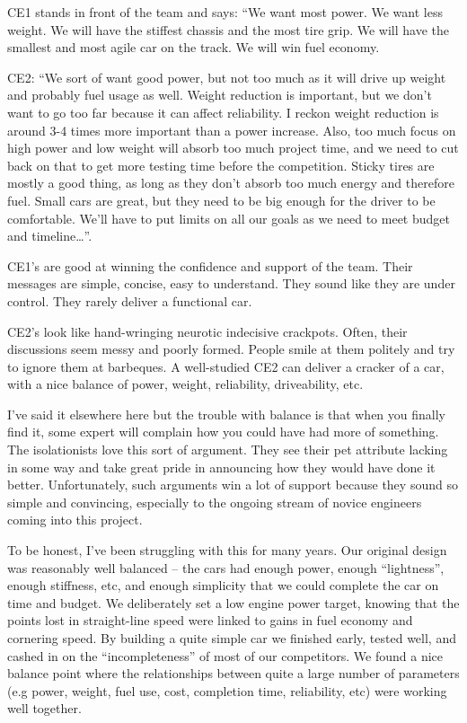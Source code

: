 \documentclass[10pt, a4paper, article, oneside, twocolumn, final]{memoir}
\begin{document}
CE1 stands in front of the team and says: “We want most power. We want less weight. We will have the stiffest chassis and the most tire grip. We will have the smallest and most agile car on the track. We will win fuel economy.

CE2: “We sort of want good power, but not too much as it will drive up weight and probably fuel usage as well. Weight reduction is important, but we don’t want to go too far because it can affect reliability. I reckon weight reduction is around 3-4 times more important than a power increase. Also, too much focus on high power and low weight will absorb too much project time, and we need to cut back on that to get more testing time before the competition. Sticky tires are mostly a good thing, as long as they don’t absorb too much energy and therefore fuel. Small cars are great, but they need to be big enough for the driver to be comfortable. We’ll have to put limits on all our goals as we need to meet budget and timeline\ldots”.

CE1’s are good at winning the confidence and support of the team. Their messages are simple, concise, easy to understand. They sound like they are under control. They rarely deliver a functional car.

CE2’s look like hand-wringing neurotic indecisive crackpots. Often, their discussions seem messy and poorly formed. People smile at them politely and try to ignore them at barbeques. A well-studied CE2 can deliver a cracker of a car, with a nice balance of power, weight, reliability, driveability, etc.

I’ve said it elsewhere here but the trouble with balance is that when you finally find it, some expert will complain how you could have had more of something. The isolationists love this sort of argument. They see their pet attribute lacking in some way and take great pride in announcing how they would have done it better. Unfortunately, such arguments win a lot of support because they sound so simple and convincing, especially to the ongoing stream of novice engineers coming into this project. 

To be honest, I’ve been struggling with this for many years. Our original design was reasonably well balanced -- the cars had enough power, enough “lightness”, enough stiffness, etc, and enough simplicity that we could complete the car on time and budget. We deliberately set a low engine power target, knowing that the points lost in straight-line speed were linked to gains in fuel economy and cornering speed. By building a quite simple car we finished early, tested well, and cashed in on the “incompleteness” of most of our competitors. We found a nice balance point where the relationships between quite a large number of parameters (e.g power, weight, fuel use, cost, completion time, reliability, etc) were working well together. 
\end{document}
